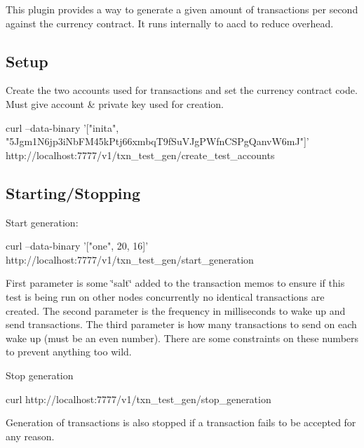 This plugin provides a way to generate a given amount of transactions per second against the currency contract. It runs internally to aacd to reduce overhead.

\subsection*{Setup}

Create the two accounts used for transactions and set the currency contract code. Must give account \& private key used for creation.


\begin{DoxyCode}
curl --data-binary '["inita", "5Jgm1N6jp3iNbFM45kPtj66xmbqT9fSuVJgPWfnCSPgQanvW6mJ"]'
       http://localhost:7777/v1/txn\_test\_gen/create\_test\_accounts
\end{DoxyCode}


\subsection*{Starting/\+Stopping}

Start generation\+:


\begin{DoxyCode}
curl --data-binary '["one", 20, 16]' http://localhost:7777/v1/txn\_test\_gen/start\_generation
\end{DoxyCode}


First parameter is some \char`\"{}salt\char`\"{} added to the transaction memos to ensure if this test is being run on other nodes concurrently no identical transactions are created. The second parameter is the frequency in milliseconds to wake up and send transactions. The third parameter is how many transactions to send on each wake up (must be an even number). There are some constraints on these numbers to prevent anything too wild.

Stop generation


\begin{DoxyCode}
curl http://localhost:7777/v1/txn\_test\_gen/stop\_generation
\end{DoxyCode}


Generation of transactions is also stopped if a transaction fails to be accepted for any reason. 